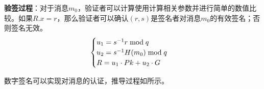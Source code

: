 {	\textbf{验签过程}：对于消息$m_0$，验证者可以计算使用计算相关参数并进行简单的数值比较。如果$R.x=r$，那么验证者可以确认$(r,s)$是签名者对消息$m_0$的有效签名；否则签名无效。
	\begin{equation}\label{eq:prepare-verify}
	\begin{cases}
		u_1=s^{-1}r\bmod q\\
		u_2=s^{-1}H(m_0)\bmod q\\
		R=u_1\cdot Pk+u_2\cdot G
	\end{cases}
	\end{equation}
	
	数字签名可以实现对消息的认证，推导过程如所示。
	
%	
%	
%	
%	
}
